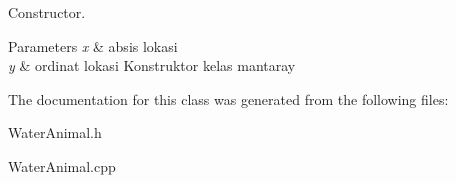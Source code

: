 Constructor. 


\begin{DoxyParams}{Parameters}
{\em x} & absis lokasi \\
\hline
{\em y} & ordinat lokasi Konstruktor kelas mantaray \\
\hline
\end{DoxyParams}


The documentation for this class was generated from the following files\+:\begin{DoxyCompactItemize}
\item 
Water\+Animal.\+h\item 
Water\+Animal.\+cpp\end{DoxyCompactItemize}

